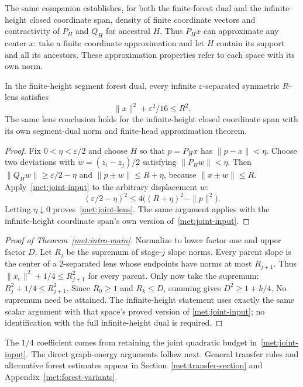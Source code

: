 The same companion establishes, for both the finite-forest dual and
the infinite-height closed coordinate span, density of finite coordinate
vectors and contractivity of $P_H$ and $Q_H$ for ancestral $H$.
Thus $P_Hx$ can approximate any center $x$: take a finite coordinate
approximation and let $H$ contain its support and all its ancestors.
These approximation properties refer to each space with its own norm.

\begin{lemma}\label{met:joint-lens-lemma}
In the finite-height segment forest dual, every infinite
$\varepsilon$-separated symmetric $R$-lens satisfies
\begin{equation}\label{met:joint-lens}
 \|x\|^2+\varepsilon^2/16\le R^2.
\end{equation}
The same lens conclusion holds for the infinite-height closed coordinate
span with its own segment-dual norm and finite-head approximation theorem.
\end{lemma}
\begin{proof}
Fix $0<\eta<\varepsilon/2$ and choose $H$ so that
$p=P_Hx$ has $\|p-x\|<\eta$. Choose two deviations with
$w=(z_i-z_j)/2$ satisfying $\|P_Hw\|<\eta$.
Then $\|Q_Hw\|\ge\varepsilon/2-\eta$ and
$\|p\pm w\|\le R+\eta$, because $\|x\pm w\|\le R$.
Apply~\eqref{met:joint-input} to the arbitrary displacement $w$:
\[
 (\varepsilon/2-\eta)^2
 \le4\bigl((R+\eta)^2-\|p\|^2\bigr).
\]
Letting $\eta\downarrow0$ proves~\eqref{met:joint-lens}. The same
argument applies with the infinite-height coordinate span's own version
of~\eqref{met:joint-input}.
\end{proof}

\begin{proof}[Proof of Theorem~\ref{met:intro-main}]
Normalize to lower factor one and upper factor $D$.
Let $R_j$ be the supremum of stage-$j$ slope norms. Every parent
slope is the center of a $2$-separated lens whose endpoints have norms
at most $R_{j+1}$. Thus $\|x_e\|^2+1/4\le R_{j+1}^2$ for every
parent. Only now take the supremum: $R_j^2+1/4\le R_{j+1}^2$.
Since $R_0\ge1$ and $R_k\le D$, summing gives $D^2\ge1+k/4$.
No supremum need be attained. The infinite-height statement uses exactly
the same scalar argument with that space's proved version of
\eqref{met:joint-input}; no identification with the full infinite-height
dual is required.
\end{proof}

The $1/4$ coefficient comes from retaining the joint quadratic budget
in~\eqref{met:joint-input}. The direct graph-energy arguments follow next. General transfer rules
and alternative forest estimates appear in Section~\ref{met:transfer-section}
and Appendix~\ref{met:forest-variants}.
